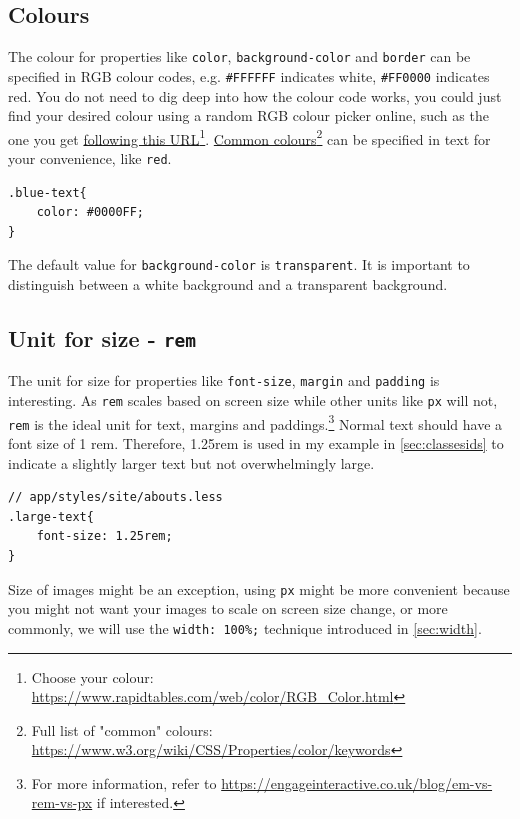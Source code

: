 \subsection{Colours}
\label{sec:colours}
The colour for properties like \texttt{color}, \texttt{background-color} and \texttt{border} can be specified in RGB colour codes, e.g. \texttt{\#FFFFFF} indicates white, \texttt{\#FF0000} indicates red. You do not need to dig deep into how the colour code works, you could just find your desired colour using a random RGB colour picker online, such as the one you get  \href{https://www.rapidtables.com/web/color/RGB_Color.html}{following this URL}\footnote{Choose your colour: \url{https://www.rapidtables.com/web/color/RGB_Color.html}}.   \href{https://www.w3.org/wiki/CSS/Properties/color/keywords}{Common colours}\footnote{Full list of "common" colours: \url{https://www.w3.org/wiki/CSS/Properties/color/keywords}} can be specified in text for your convenience, like \texttt{red}.

\begin{lstlisting}
.blue-text{
    color: #0000FF; 
}
\end{lstlisting}

The default value for \texttt{background-color} is \texttt{transparent}. It is important to distinguish between a white background and a transparent background. 

\subsection{Unit for size - \texttt{rem}}
\label{sec:rem}

The unit for size for properties like \texttt{font-size}, \texttt{margin} and \texttt{padding} is interesting. As \texttt{rem} scales based on screen size while other units like \texttt{px} will not, \texttt{rem} is the ideal unit for text, margins and paddings.\footnote{For more information, refer to \url{https://engageinteractive.co.uk/blog/em-vs-rem-vs-px} if interested.} Normal text should have a font size of 1 rem. Therefore, 1.25rem is used in my example in \cref{sec:classesids} to indicate a slightly larger text but not overwhelmingly large.

\begin{lstlisting}[language=pug]
// app/styles/site/abouts.less
.large-text{
    font-size: 1.25rem;
}
\end{lstlisting}

Size of images might be an exception, using \texttt{px} might be more convenient because you might not want your images to scale on screen size change, or more commonly, we will use the \texttt{width: 100\%;} technique introduced in \cref{sec:width}.

